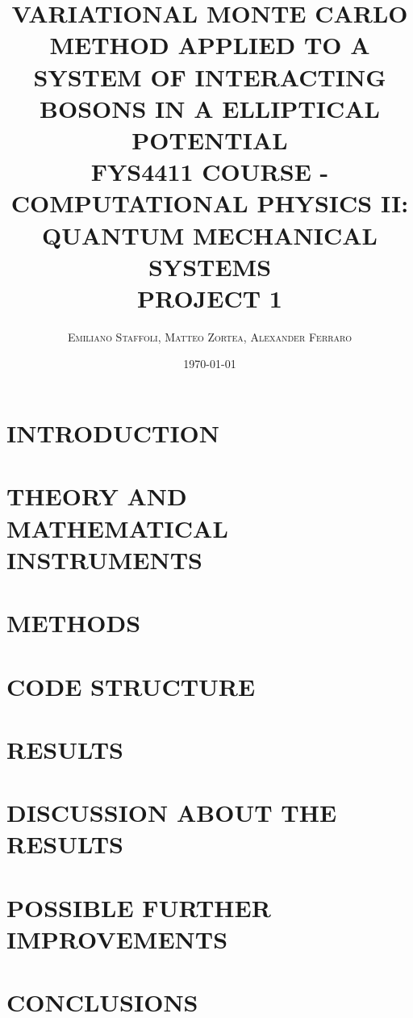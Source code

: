 \documentclass[a4paper]{article}
\title{\LARGE VARIATIONAL MONTE CARLO METHOD APPLIED TO A SYSTEM OF INTERACTING BOSONS IN A ELLIPTICAL POTENTIAL \\ \vspace{5mm}  \large FYS4411 COURSE - COMPUTATIONAL PHYSICS II: QUANTUM MECHANICAL SYSTEMS \\ \large PROJECT 1 }
\author{\textsc{Emiliano Staffoli, Matteo Zortea, Alexander Ferraro }}
\date{\today}
\begin{document}
\setcounter{page}{1}

\maketitle



\begin{multicols*}{2}
 \noindent

\section{INTRODUCTION}
\label{sec:introduction}
   
   
\section{THEORY AND MATHEMATICAL INSTRUMENTS}
\label{sec:theory}
    
   
\section{METHODS}
\label{sec:methods}
    
    
\section{CODE STRUCTURE}
\label{sec:code}



\section{RESULTS}
\label{sec:results}


\section{DISCUSSION ABOUT THE RESULTS}
\label{sec:discussion}


\section{POSSIBLE FURTHER IMPROVEMENTS}
\label{sec:improvements}


\section{CONCLUSIONS}
\label{sec:conclusions}

\end{multicols*}
\end{document}
